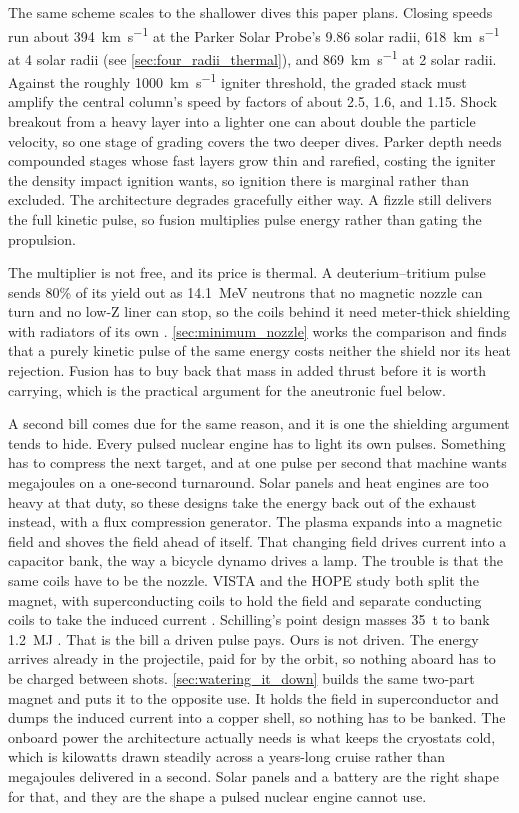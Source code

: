 \documentclass{article}
\begin{document}
The same scheme scales to the shallower dives this paper plans. Closing speeds run about \SI{394}{\kilo\meter\per\second} at the Parker Solar Probe's 9.86 solar radii, \SI{618}{\kilo\meter\per\second} at 4 solar radii (see \autoref{sec:four_radii_thermal}), and \SI{869}{\kilo\meter\per\second} at 2 solar radii. Against the roughly \SI{1000}{\kilo\meter\per\second} igniter threshold, the graded stack must amplify the central column's speed by factors of about 2.5, 1.6, and 1.15. Shock breakout from a heavy layer into a lighter one can about double the particle velocity, so one stage of grading covers the two deeper dives. Parker depth needs compounded stages whose fast layers grow thin and rarefied, costing the igniter the density impact ignition wants, so ignition there is marginal rather than excluded. The architecture degrades gracefully either way. A fizzle still delivers the full kinetic pulse, so fusion multiplies pulse energy rather than gating the propulsion.

The multiplier is not free, and its price is thermal. A deuterium--tritium pulse sends 80\% of its yield out as \SI{14.1}{\mega\electronvolt} neutrons that no magnetic nozzle can turn and no low-Z liner can stop, so the coils behind it need meter-thick shielding with radiators of its own \cite{orth2003vista}. \autoref{sec:minimum_nozzle} works the comparison and finds that a purely kinetic pulse of the same energy costs neither the shield nor its heat rejection. Fusion has to buy back that mass in added thrust before it is worth carrying, which is the practical argument for the aneutronic fuel below.

A second bill comes due for the same reason, and it is one the shielding argument tends to hide. Every pulsed nuclear engine has to light its own pulses. Something has to compress the next target, and at one pulse per second that machine wants megajoules on a one-second turnaround. Solar panels and heat engines are too heavy at that duty, so these designs take the energy back out of the exhaust instead, with a flux compression generator. The plasma expands into a magnetic field and shoves the field ahead of itself. That changing field drives current into a capacitor bank, the way a bicycle dynamo drives a lamp. The trouble is that the same coils have to be the nozzle. VISTA and the HOPE study both split the magnet, with superconducting coils to hold the field and separate conducting coils to take the induced current \cite{orth2003vista,schilling2022nozzle}. Schilling's point design masses \SI{35}{\tonne} to bank \SI{1.2}{\mega\joule} \cite{schilling2022nozzle}. That is the bill a driven pulse pays. Ours is not driven. The energy arrives already in the projectile, paid for by the orbit, so nothing aboard has to be charged between shots. \autoref{sec:watering_it_down} builds the same two-part magnet and puts it to the opposite use. It holds the field in superconductor and dumps the induced current into a copper shell, so nothing has to be banked. The onboard power the architecture actually needs is what keeps the cryostats cold, which is kilowatts drawn steadily across a years-long cruise rather than megajoules delivered in a second. Solar panels and a battery are the right shape for that, and they are the shape a pulsed nuclear engine cannot use.
\end{document}
